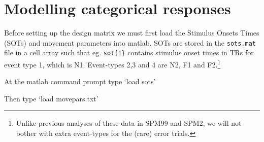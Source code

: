 \section{Modelling categorical responses}

Before setting up the design matrix we must first 
load the Stimulus Onsets Times (SOTs) and movement
parameters into matlab. SOTs are stored in the 
\verb!sots.mat! file in a 
cell array such that eg. \verb!sot{1}! contains 
stimulus onset times in TRs for event type 1, which is N1. Event-types 2,3 and 4 are N2, F1 and F2.\footnote{Unlike previous analyses of these data in SPM99 and SPM2, we will not bother with extra event-types for the (rare) error trials.}
\bi
\item{At the matlab command prompt type `load sots'}
\item{Then type `load movepars.txt'}
\ei

